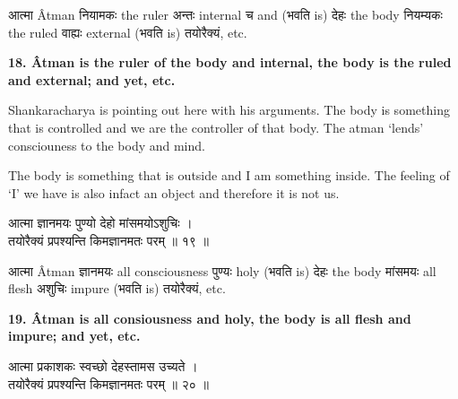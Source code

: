 \documentclass{article}
\begin{document}
\texthindi{आत्मा}
Âtman
\texthindi{नियामकः}
the ruler
\texthindi{अन्तः}
internal
\texthindi{च}
and
(\texthindi{भवति}
is)
\texthindi{देहः}
the body
\texthindi{नियम्यकः}
the ruled
\texthindi{वाह्यः}
external
(\texthindi{भवति}
is)
\texthindi{तयोरैक्यं,}
etc.

\bigskip

\textbf{18.  Âtman is the ruler of the body and internal, the body is the ruled
and external; and yet, etc. }

\begin{oframed}

    Shankaracharya is pointing out here with his arguments. The body is
    something that is controlled and we are the controller of that body. 
    The atman `lends' consciouness to the body and mind.

    The body is something that is outside and I am something inside.  The
    feeling of `I' we have is also infact an object and therefore it is not us.

\end{oframed}

\begin{large}
\begin{center}
    \begin{hindi}
आत्मा ज्ञानमयः पुण्यो देहो मांसमयोऽशुचिः ।\\
तयोरैक्यं प्रपश्यन्ति किमज्ञानमतः परम् ॥ १९ ॥
    \end{hindi}
\end{center}
\end{large}

\texthindi{आत्मा}
Âtman
\texthindi{ज्ञानमयः}
all consciousness
\texthindi{पुण्यः}
holy
(\texthindi{भवति}
is)
\texthindi{देहः}
the body
\texthindi{मांसमयः}
all flesh
\texthindi{अशुचिः}
impure
(\texthindi{भवति}
is)
\texthindi{तयोरैक्यं,}
etc.

\bigskip

\textbf{
    19. Âtman is all consiousness and holy, the body is all flesh and impure;
    and yet, etc.
}


\begin{large}
\begin{center}
    \begin{hindi}
आत्मा प्रकाशकः स्वच्छो देहस्तामस उच्यते ।\\
तयोरैक्यं प्रपश्यन्ति किमज्ञानमतः परम् ॥ २० ॥
    \end{hindi}
\end{center}
\end{large}
\end{document}
